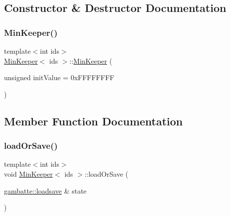 \subsection{Constructor \& Destructor Documentation}
\mbox{\label{classMinKeeper_a131eb12143092dbce960174124d60663}} 
\subsubsection{\texorpdfstring{Min\+Keeper()}{MinKeeper()}}
{\footnotesize\ttfamily template$<$int ids$>$ \\
\hyperlink{classMinKeeper}{Min\+Keeper}$<$ ids $>$\+::\hyperlink{classMinKeeper}{Min\+Keeper} (\begin{DoxyParamCaption}\item[{unsigned}]{init\+Value = {\ttfamily 0xFFFFFFFF} }\end{DoxyParamCaption})\hspace{0.3cm}{\ttfamily [explicit]}}



\subsection{Member Function Documentation}
\mbox{\label{classMinKeeper_a00b6df8254b050b77b9c1350a0b7d386}} 
\subsubsection{\texorpdfstring{load\+Or\+Save()}{loadOrSave()}}
{\footnotesize\ttfamily template$<$int ids$>$ \\
void \hyperlink{classMinKeeper}{Min\+Keeper}$<$ ids $>$\+::load\+Or\+Save (\begin{DoxyParamCaption}\item[{\hyperlink{classgambatte_1_1loadsave}{gambatte\+::loadsave} \&}]{state }\end{DoxyParamCaption})\hspace{0.3cm}{\ttfamily [inline]}}

\mbox{\label{classMinKeeper_a27b4f4cc206c7e587231929994d26705}} 
